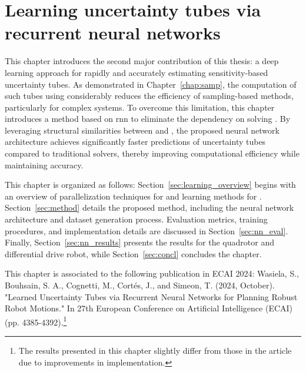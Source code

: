 \chapter{Learning uncertainty tubes via recurrent neural networks} \label{chap:NN}

This chapter introduces the second major contribution of this thesis: a deep learning approach for rapidly and accurately estimating sensitivity-based uncertainty tubes. 
As demonstrated in Chapter~\ref{chap:samp}, the computation of such tubes using  considerably reduces the efficiency of sampling-based methods, particularly for complex systems.
To overcome this limitation, this chapter introduces a method based on \gls{rnn} to eliminate the dependency on solving .
By leveraging structural similarities between  and , the proposed neural network architecture achieves significantly faster predictions of uncertainty tubes compared to traditional solvers, thereby improving computational efficiency while maintaining accuracy.

This chapter is organized as follows: Section~\ref{sec:learning_overview} begins with an overview of parallelization techniques for  and learning methods for .
Section~\ref{sec:method} details the proposed method, including the neural network architecture and dataset generation process. 
Evaluation metrics, training procedures, and implementation details are discussed in Section~\ref{sec:nn_eval}. 
Finally, Section~\ref{sec:nn_results} presents the results for the quadrotor and differential drive robot, while Section~\ref{sec:concl} concludes the chapter.

This chapter is associated to the following publication in ECAI 2024: Wasiela, S., Bouhsain, S. A., Cognetti, M., Cortés, J., and Simeon, T. (2024, October). "Learned Uncertainty Tubes via Recurrent Neural Networks for Planning Robust Robot Motions." In 27th European Conference on Artificial Intelligence (ECAI) (pp. 4385-4392).\footnote{The results presented in this chapter slightly differ from those in the article due to improvements in implementation.}


